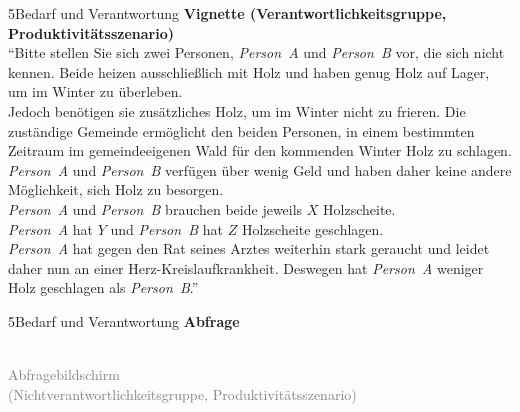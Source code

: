 \documentclass[xcolor=table,9pt,aspectratio=169]{beamer}
\begin{document}
\begin{frame}{\vspace*{10mm}5\hspace*{1em}Bedarf und Verantwortung}
\textbf{Vignette (Verantwortlichkeitsgruppe, Produktivitätsszenario)}\\
\medskip
\enquote{Bitte stellen Sie sich zwei Personen, \textit{Person~A} und \textit{Person~B} vor, die sich nicht kennen. Beide heizen ausschließlich mit Holz und haben genug Holz auf Lager, um im Winter zu überleben.\\
\medskip
Jedoch benötigen sie zusätzliches Holz, um im Winter nicht zu frieren. Die zuständige Gemeinde ermöglicht den beiden Personen, in einem bestimmten Zeitraum im gemeindeeigenen Wald für den kommenden Winter Holz zu schlagen. \textit{Person~A} und \textit{Person~B} verfügen über wenig Geld und haben daher keine andere Möglichkeit, sich Holz zu besorgen.\\
\medskip
\textit{Person~A} und \textit{Person~B} brauchen beide jeweils $X$ Holzscheite.\\
\medskip
\textit{Person~A} hat $Y$ und \textit{Person~B} hat $Z$ Holzscheite geschlagen.\\
\medskip
\textit{Person~A} hat gegen den Rat seines Arztes weiterhin stark geraucht und leidet daher nun an einer Herz-Kreislaufkrankheit. Deswegen hat \textit{Person~A} weniger Holz geschlagen als \textit{Person~B}.}
\end{frame}


\begin{frame}{\vspace*{10mm}5\hspace*{1em}Bedarf und Verantwortung}
\textbf{Abfrage}\\
\medskip
\begin{center}
   \\
   \textcolor{gray}{Abfragebildschirm\\(Nichtverantwortlichkeitsgruppe, Produktivitätsszenario)}
\end{center}
\end{frame}
\end{document}
